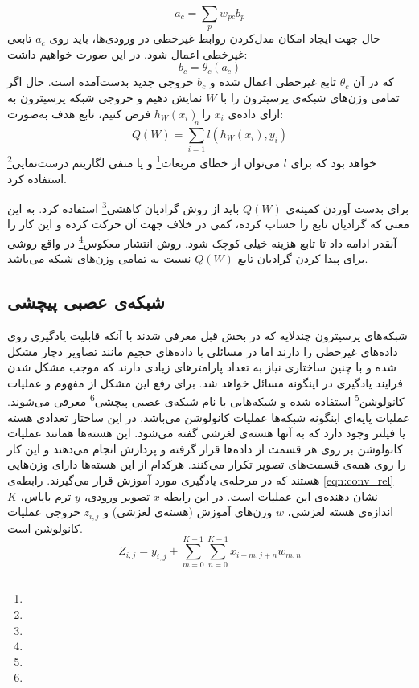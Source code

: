 \begin{equation}
	a_c = \sum_{p}^{} w_{pc} b_{p}
\end{equation}
حال جهت ایجاد امکان مدل‌کردن روابط غیر‌خطی در ورودی‌ها، باید روی $a_c$ تابعی غیرخطی اعمال شود. در این صورت خواهیم داشت:
\begin{equation}
	b_c = \theta_c (a_c)
\end{equation}
که در آن $\theta_c$ تابع غیر‌خطی اعمال شده و $b_c$ خروجی جدید بدست‌آمده است. حال اگر تمامی‌ وزن‌های شبکه‌ی پرسپترون‌ را با $W$ نمایش دهیم و خروجی شبکه پرسپترون به ازای داده‌ی $x_i$ را $h_W(x_i)$ فرض کنیم، تابع هدف به‌صورت:
\begin{equation}
	Q(W) = \sum_{i = 1}^{n} l(h_W(x_i), y_i)
\end{equation}
خواهد بود که برای $l$ می‌توان از خطای‌ مربعات\footnote{} و یا منفی لگاریتم درست‌نمایی\footnote{} استفاده کرد. 

برای بدست آوردن کمینه‌ی $Q(W)$ باید از روش گرادیان کاهشی\footnote{} استفاده کرد.  به این معنی که گرادیان تابع را حساب کرده، کمی در خلاف جهت آن حرکت کرده و این کار را آنقدر ادامه داد تا تابع هزینه خیلی کوچک شود. روش انتشار معکوس\footnote{} در واقع روشی برای پیدا کردن گرادیان تابع $Q(W)$ نسبت به تمامی وزن‌های شبکه می‌باشد.

\subsection{شبکه‌ی عصبی پیچشی}
شبکه‌های پرسپترون چندلایه که در بخش قبل معرفی شدند با آنکه قابلیت یادگیری روی داده‌های غیرخطی را دارند اما در مسائلی با داده‌های حجیم مانند تصاویر دچار مشکل شده و با چنین ساختاری نیاز به تعداد پارامترهای زیادی دارند که موجب مشکل شدن فرایند یادگیری در اینگونه مسائل خواهد شد. برای رفع این مشکل از مفهوم و عملیات کانولوشن\footnote{} استفاده شده و شبکه‌هایی با نام شبکه‌ی عصبی پیچشی\footnote{} معرفی می‌شوند. عملیات پایه‌ای اینگونه شبکه‌ها عملیات کانولوشن می‌باشد. در این ساختار تعدادی هسته یا فیلتر وجود دارد که به آنها هسته‌ی لغزشی گفته می‌شود. این هسته‌ها همانند عملیات کانولوشن بر روی هر قسمت از داده‌ها قرار گرفته و پردازش انجام می‌دهند و این کار را روی همه‌ی قسمت‌های تصویر تکرار می‌کنند. هرکدام از این هسته‌ها دارای وزن‌هایی هستند که در مرحله‌ی یادگیری مورد آموزش قرار می‌گیرند. رابطه‌ی \ref{eqn:conv_rel} نشان دهنده‌ی این عملیات است. در این رابطه $x$ تصویر ورودی، $y$ ترم بایاس، $K$ اندازه‌ی هسته لغزشی،  $w$ وزن‌های آموزش (هسته‌ی لغزشی) و $z_{i, j}$ خروجی عملیات کانولوشن است. 
\begin{equation}
\label{eqn:conv_rel}
	Z_{i,j} = y_{i, j} + \sum_{m=0}^{K-1}\sum_{n=0}^{K-1}x_{i+m, j+n}w_{m,n}
\end{equation}

